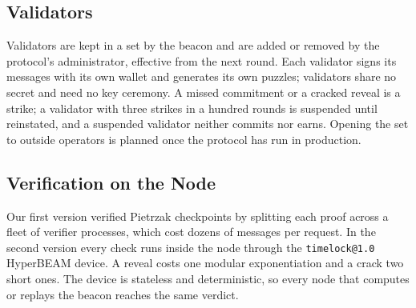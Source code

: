 \subsection{Validators}\label{sec:validators}

Validators are kept in a set by the beacon and are added or removed by the protocol's administrator, effective from the next round. Each validator signs its messages with its own wallet and generates its own puzzles; validators share no secret and need no key ceremony. A missed commitment or a cracked reveal is a strike; a validator with three strikes in a hundred rounds is suspended until reinstated, and a suspended validator neither commits nor earns. Opening the set to outside operators is planned once the protocol has run in production.

\subsection{Verification on the Node}\label{sec:device}

Our first version verified Pietrzak checkpoints by splitting each proof across a fleet of verifier processes, which cost dozens of messages per request. In the second version every check runs inside the node through the \texttt{timelock@1.0} HyperBEAM device. A reveal costs one modular exponentiation and a crack two short ones. The device is stateless and deterministic, so every node that computes or replays the beacon reaches the same verdict.
